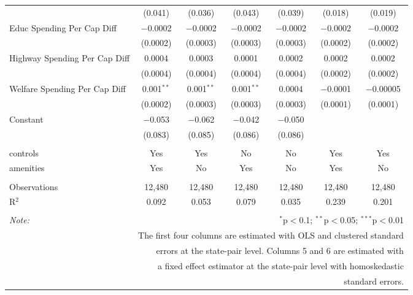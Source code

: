 \begin{table}[!htbp]
\begin{tabular}{@{\extracolsep{5pt}}lcccccc}
  & (0.041) & (0.036) & (0.043) & (0.039) & (0.018) & (0.019) \\ 
  Educ Spending Per Cap Diff & $-$0.0002 & $-$0.0002 & $-$0.0002 & $-$0.0002 & $-$0.0002 & $-$0.0002 \\ 
  & (0.0002) & (0.0003) & (0.0003) & (0.0003) & (0.0002) & (0.0002) \\ 
  Highway Spending Per Cap Diff & 0.0004 & 0.0003 & 0.0001 & 0.0002 & 0.0002 & 0.0002 \\ 
  & (0.0004) & (0.0004) & (0.0004) & (0.0004) & (0.0002) & (0.0002) \\ 
  Welfare Spending Per Cap Diff & 0.001$^{**}$ & 0.001$^{**}$ & 0.001$^{**}$ & 0.0004 & $-$0.0001 & $-$0.00005 \\ 
  & (0.0002) & (0.0003) & (0.0003) & (0.0003) & (0.0001) & (0.0001) \\ 
  Constant & $-$0.053 & $-$0.062 & $-$0.042 & $-$0.050 &  &  \\ 
  & (0.083) & (0.085) & (0.086) & (0.086) &  &  \\ 
 \hline \\[-1.8ex] 
controls & Yes & Yes & No & No & Yes & Yes \\ 
amenities & Yes & No & Yes & No & Yes & No \\ 
\hline \\[-1.8ex] 
Observations & 12,480 & 12,480 & 12,480 & 12,480 & 12,480 & 12,480 \\ 
R$^{2}$ & 0.092 & 0.053 & 0.079 & 0.035 & 0.239 & 0.201 \\ 
\hline 
\hline \\[-1.8ex] 
\textit{Note:}  & \multicolumn{6}{r}{$^{*}$p$<$0.1; $^{**}$p$<$0.05; $^{***}$p$<$0.01} \\ 
 & \multicolumn{6}{r}{The first four columns are estimated with OLS and clustered standard} \\ 
 & \multicolumn{6}{r}{ errors at the state-pair level. Columns 5 and 6 are estimated with} \\ 
 & \multicolumn{6}{r}{a fixed effect estimator at the state-pair level with homoskedastic} \\ 
 & \multicolumn{6}{r}{standard errors.} \\ 
\end{tabular} 
\end{table} 
